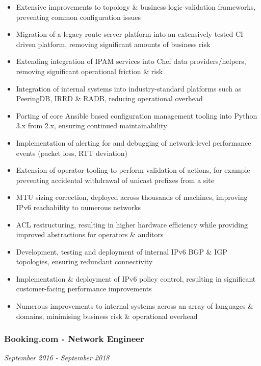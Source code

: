 \begin{itemize}
\tightlist
\item
  Extensive improvements to topology \& business logic validation
  frameworks, preventing common configuration issues
\item
  Migration of a legacy route server platform into an extensively tested
  CI driven platform, removing significant amounts of business risk
\item
  Extending integration of IPAM services into Chef data
  providers/helpers, removing significant operational friction \& risk
\item
  Integration of internal systems into industry-standard platforms such
  as PeeringDB, IRRD \& RADB, reducing operational overhead
\item
  Porting of core Ansible based configuration management tooling into
  Python 3.x from 2.x, ensuring continued maintainability
\item
  Implementation of alerting for and debugging of network-level
  performance events (packet loss, RTT deviation)
\item
  Extension of operator tooling to perform validation of actions, for
  example preventing accidental withdrawal of unicast prefixes from a
  site
\item
  MTU sizing correction, deployed across thousands of machines,
  improving IPv6 reachability to numerous networks
\item
  ACL restructuring, resulting in higher hardware efficiency while
  providing improved abstractions for operators \& auditors
\item
  Development, testing and deployment of internal IPv6 BGP \& IGP
  topologies, ensuring redundant connectivity
\item
  Implementation \& deployment of IPv6 policy control, resulting in
  significant customer-facing performance improvements
\item
  Numerous improvements to internal systems across an array of languages
  \& domains, minimising business risk \& operational overhead
\end{itemize}

\hypertarget{booking.com---network-engineer}{%
\subsubsection{Booking.com - Network
Engineer}\label{booking.com---network-engineer}}

\emph{September 2016 - September 2018}

